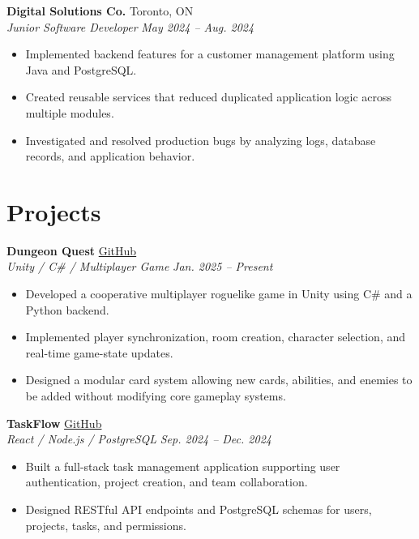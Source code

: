 \documentclass[11pt,letterpaper]{article}
\newcommand{\resumeEntry}[4]{
    \textbf{#1} \hfill #2 \\
    \textit{#3} \hfill \textit{#4}
}
\begin{document}
\resumeEntry
    {Digital Solutions Co.}
    {Toronto, ON}
    {Junior Software Developer}
    {May 2024 -- Aug. 2024}

\begin{itemize}
    \item Implemented backend features for a customer management platform using Java and PostgreSQL.
    \item Created reusable services that reduced duplicated application logic across multiple modules.
    \item Investigated and resolved production bugs by analyzing logs, database records, and application behavior.
\end{itemize}


\section{Projects}

\resumeEntry
    {Dungeon Quest}
    {\href{https://github.com/alexjohnson/dungeon-quest}{GitHub}}
    {Unity / C\# / Multiplayer Game}
    {Jan. 2025 -- Present}

\begin{itemize}
    \item Developed a cooperative multiplayer roguelike game in Unity using C\# and a Python backend.
    \item Implemented player synchronization, room creation, character selection, and real-time game-state updates.
    \item Designed a modular card system allowing new cards, abilities, and enemies to be added without modifying core gameplay systems.
\end{itemize}

\resumeEntry
    {TaskFlow}
    {\href{https://github.com/alexjohnson/taskflow}{GitHub}}
    {React / Node.js / PostgreSQL}
    {Sep. 2024 -- Dec. 2024}

\begin{itemize}
    \item Built a full-stack task management application supporting user authentication, project creation, and team collaboration.
    \item Designed RESTful API endpoints and PostgreSQL schemas for users, projects, tasks, and permissions.
\end{itemize}
\end{document}
